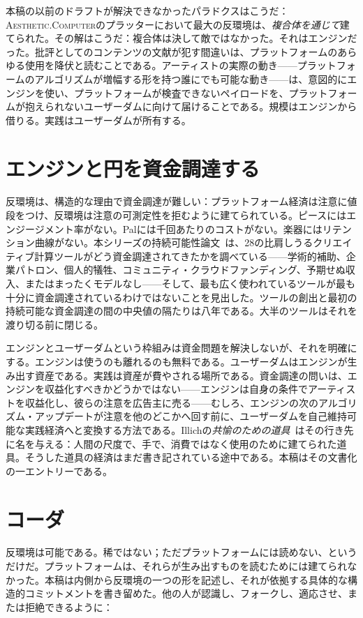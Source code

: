 \documentclass[10pt,letterpaper,twocolumn]{article}
\newcommand{\ac}{\textsc{Aesthetic.Computer}}
\begin{document}
本稿の以前のドラフトが解決できなかったパラドクスはこうだ：\ac{}のプラッターにおいて最大の反環境は、\emph{複合体を通じて}建てられた。その解はこうだ：複合体は決して敵ではなかった。それはエンジンだった。批評としてのコンテンツの文献が犯す間違いは、プラットフォームのあらゆる使用を降伏と読むことである。アーティストの実際の動き——プラットフォームのアルゴリズムが増幅する形を持つ誰にでも可能な動き——は、意図的にエンジンを使い、プラットフォームが検査できないペイロードを、プラットフォームが抱えられないユーザーダムに向けて届けることである。規模はエンジンから借りる。実践はユーザーダムが所有する。

\section{エンジンと円を資金調達する}

反環境は、構造的な理由で資金調達が難しい：プラットフォーム経済は注意に値段をつけ、反環境は注意の可測定性を拒むように建てられている。ピースにはエンジージメント率がない。Palには千回あたりのコストがない。楽器にはリテンション曲線がない。本シリーズの持続可能性論文~\citep{scudder2026sustainability}は、28の比肩しうるクリエイティブ計算ツールがどう資金調達されてきたかを調べている——学術的補助、企業パトロン、個人的犠牲、コミュニティ・クラウドファンディング、予期せぬ収入、またはまったくモデルなし——そして、最も広く使われているツールが最も十分に資金調達されているわけではないことを見出した。ツールの創出と最初の持続可能な資金調達の間の中央値の隔たりは八年である。大半のツールはそれを渡り切る前に閉じる。

エンジンとユーザーダムという枠組みは資金問題を解決しないが、それを明確にする。エンジンは使うのも離れるのも無料である。ユーザーダムはエンジンが生み出す資産である。実践は資産が費やされる場所である。資金調達の問いは、エンジンを収益化すべきかどうかではない——エンジンは自身の条件でアーティストを収益化し、彼らの注意を広告主に売る——むしろ、エンジンの次のアルゴリズム・アップデートが注意を他のどこかへ回す前に、ユーザーダムを自己維持可能な実践経済へと変換する方法である。Illichの\emph{共愉のための道具}~\citep{illich1973tools}はその行き先に名を与える：人間の尺度で、手で、消費ではなく使用のために建てられた道具。そうした道具の経済はまだ書き記されている途中である。本稿はその文書化の一エントリーである。

\section{コーダ}

反環境は可能である。稀ではない；ただプラットフォームには読めない、というだけだ。プラットフォームは、それらが生み出すものを読むためには建てられなかった。本稿は内側から反環境の一つの形を記述し、それが依拠する具体的な構造的コミットメントを書き留めた。他の人が認識し、フォークし、適応させ、または拒絶できるように：
\end{document}
